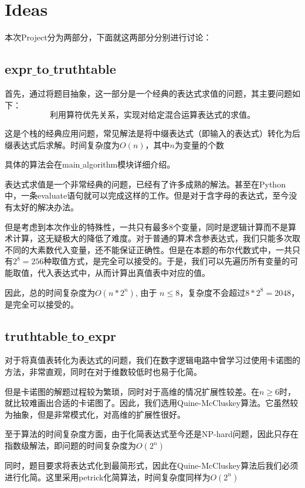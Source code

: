 \section{Ideas}

本次Project分为两部分，下面就这两部分分别进行讨论：

\subsection{expr$\_$to$\_$truthtable}
	首先，通过将题目抽象，这一部分是一个经典的表达式求值的问题，其主要问题如下：
		$$\mbox{利用算符优先关系，实现对给定混合运算表达式的求值。}$$
		
	这是个栈的经典应用问题，常见解法是将中缀表达式（即输入的表达式）转化为后缀表达式后求解。时间复杂度为$O(n)$，其中$n$为变量的个数
	
	具体的算法会在main$\_$algorithm模块详细介绍。
	
	表达式求值是一个非常经典的问题，已经有了许多成熟的解法。甚至在Python中，一条evaluate语句就可以完成这样的工作。但是对于含字母的表达式，至今没有太好的解决办法。
	
	但是考虑到本次作业的特殊性，一共只有最多8个变量，同时是逻辑计算而不是算术计算，这无疑极大的降低了难度。对于普通的算术含参表达式，我们只能多次取不同的大素数代入变量，还不能保证正确性。但是在本题的布尔代数式中，一共只有$2 ^ 8 = 256$种取值方式，是完全可以接受的。于是，我们可以先遍历所有变量的可能取值，代入表达式中，从而计算出真值表中对应的值。
	
	因此，总的时间复杂度为$O(n * 2 ^ n)$, 由于 $n \le 8$，复杂度不会超过$8 * 2 ^ 8 = 2048$，是完全可以接受的。
\subsection{truthtable$\_$to$\_$expr}

	对于将真值表转化为表达式的问题，我们在数字逻辑电路中曾学习过使用卡诺图的方法，非常直观，同时在对于维数较低时也易于化简。
	
	但是卡诺图的解题过程较为繁琐，同时对于高维的情况扩展性较差。在$n \geq 6$时，就比较难画出合适的卡诺图了。因此，我们选用Quine-McCluskey算法。它虽然较为抽象，但是非常模式化，对高维的扩展性很好。
	
	至于算法的时间复杂度方面，由于化简表达式至今还是NP-hard问题，因此只存在指数级解法，即问题的时间复杂度为$O(2 ^ n)$
	
	同时，题目要求将表达式化到最简形式，因此在Quine-McCluskey算法后我们必须进行化简。这里采用petrick化简算法，时间复杂度同样为$O(2 ^ n)$
	
